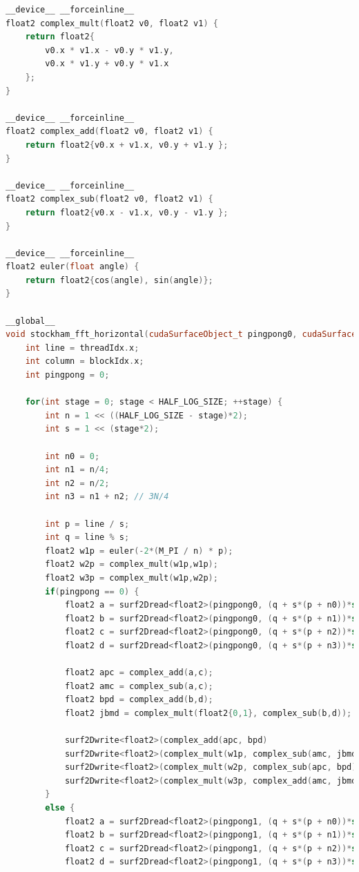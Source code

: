 \documentclass[
  oneside,
  11pt, a4paper,
  footinclude=true,
  headinclude=true,
  cleardoublepage=empty
]{scrbook}
\begin{document}
\begin{lstlisting}[language=C++,caption={FFT Radix-4 Stockham, see \autoref{sec:implementation-analysis-in-cuda}},label={lst:cuda-radix2-stockham}]
__device__ __forceinline__
float2 complex_mult(float2 v0, float2 v1) {
    return float2{
        v0.x * v1.x - v0.y * v1.y,
        v0.x * v1.y + v0.y * v1.x
    };
}

__device__ __forceinline__
float2 complex_add(float2 v0, float2 v1) {
    return float2{v0.x + v1.x, v0.y + v1.y };
}

__device__ __forceinline__
float2 complex_sub(float2 v0, float2 v1) {
    return float2{v0.x - v1.x, v0.y - v1.y };
}

__device__ __forceinline__
float2 euler(float angle) {
    return float2{cos(angle), sin(angle)};
}

__global__
void stockham_fft_horizontal(cudaSurfaceObject_t pingpong0, cudaSurfaceObject_t pingpong1, float fft_dir) {
    int line = threadIdx.x;
    int column = blockIdx.x;
    int pingpong = 0;

    for(int stage = 0; stage < HALF_LOG_SIZE; ++stage) {
        int n = 1 << ((HALF_LOG_SIZE - stage)*2);
        int s = 1 << (stage*2);

        int n0 = 0;
        int n1 = n/4;
        int n2 = n/2;
        int n3 = n1 + n2; // 3N/4

        int p = line / s;
        int q = line % s;
        float2 w1p = euler(-2*(M_PI / n) * p);
        float2 w2p = complex_mult(w1p,w1p);
        float2 w3p = complex_mult(w1p,w2p);
        if(pingpong == 0) {
            float2 a = surf2Dread<float2>(pingpong0, (q + s*(p + n0))*sizeof(float2), column);
            float2 b = surf2Dread<float2>(pingpong0, (q + s*(p + n1))*sizeof(float2), column);
            float2 c = surf2Dread<float2>(pingpong0, (q + s*(p + n2))*sizeof(float2), column);
            float2 d = surf2Dread<float2>(pingpong0, (q + s*(p + n3))*sizeof(float2), column);

            float2 apc = complex_add(a,c);
            float2 amc = complex_sub(a,c);
            float2 bpd = complex_add(b,d);
            float2 jbmd = complex_mult(float2{0,1}, complex_sub(b,d));

            surf2Dwrite<float2>(complex_add(apc, bpd)                    , pingpong1, (q + s*(4*p + 0))*sizeof(float2), column);
            surf2Dwrite<float2>(complex_mult(w1p, complex_sub(amc, jbmd)), pingpong1, (q + s*(4*p + 1))*sizeof(float2), column);
            surf2Dwrite<float2>(complex_mult(w2p, complex_sub(apc, bpd)) , pingpong1, (q + s*(4*p + 2))*sizeof(float2), column);
            surf2Dwrite<float2>(complex_mult(w3p, complex_add(amc, jbmd)), pingpong1, (q + s*(4*p + 3))*sizeof(float2), column);
        }
        else {
            float2 a = surf2Dread<float2>(pingpong1, (q + s*(p + n0))*sizeof(float2), column);
            float2 b = surf2Dread<float2>(pingpong1, (q + s*(p + n1))*sizeof(float2), column);
            float2 c = surf2Dread<float2>(pingpong1, (q + s*(p + n2))*sizeof(float2), column);
            float2 d = surf2Dread<float2>(pingpong1, (q + s*(p + n3))*sizeof(float2), column);


\end{lstlisting}
\end{document}
